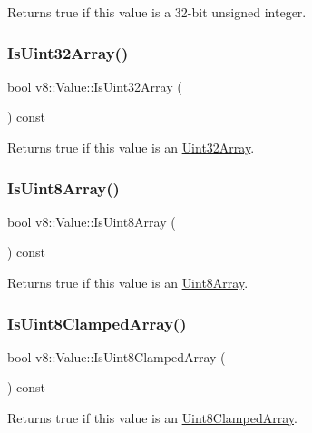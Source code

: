 Returns true if this value is a 32-\/bit unsigned integer. \mbox{\label{classv8_1_1Value_a52fe549df18b0c77a875d7aa61f87317}} 
\subsubsection{\texorpdfstring{Is\+Uint32\+Array()}{IsUint32Array()}}
{\footnotesize\ttfamily bool v8\+::\+Value\+::\+Is\+Uint32\+Array (\begin{DoxyParamCaption}{ }\end{DoxyParamCaption}) const}

Returns true if this value is an \mbox{\hyperlink{classv8_1_1Uint32Array}{Uint32\+Array}}. \mbox{\label{classv8_1_1Value_af11d828f1a78df0de696e210571b7860}} 
\subsubsection{\texorpdfstring{Is\+Uint8\+Array()}{IsUint8Array()}}
{\footnotesize\ttfamily bool v8\+::\+Value\+::\+Is\+Uint8\+Array (\begin{DoxyParamCaption}{ }\end{DoxyParamCaption}) const}

Returns true if this value is an \mbox{\hyperlink{classv8_1_1Uint8Array}{Uint8\+Array}}. \mbox{\label{classv8_1_1Value_a655a46fa71c8a33d138756d8a6c515ac}} 
\subsubsection{\texorpdfstring{Is\+Uint8\+Clamped\+Array()}{IsUint8ClampedArray()}}
{\footnotesize\ttfamily bool v8\+::\+Value\+::\+Is\+Uint8\+Clamped\+Array (\begin{DoxyParamCaption}{ }\end{DoxyParamCaption}) const}

Returns true if this value is an \mbox{\hyperlink{classv8_1_1Uint8ClampedArray}{Uint8\+Clamped\+Array}}. \mbox{\label{classv8_1_1Value_ad3a7686feef02fbe0317570b9640b078}} 
